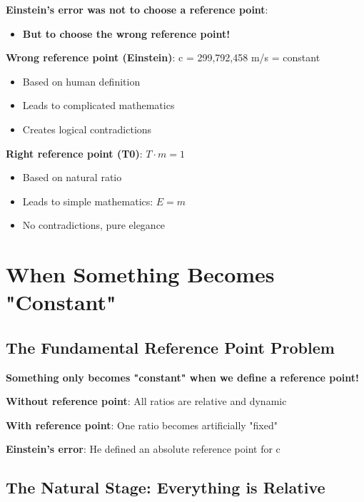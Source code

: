 \documentclass[12pt,a4paper]{article}
\newcommand{\Tfield}{T}
\begin{document}
	\textbf{Einstein's error was not to choose a reference point}:
	\begin{itemize}
		\item \textbf{But to choose the wrong reference point!}
	\end{itemize}
	
	\textbf{Wrong reference point (Einstein)}: c = 299,792,458 m/s = constant
	\begin{itemize}
		\item Based on human definition
		\item Leads to complicated mathematics
		\item Creates logical contradictions
	\end{itemize}
	
	\textbf{Right reference point (T0)}: $\Tfield \cdot m = 1$
	\begin{itemize}
		\item Based on natural ratio
		\item Leads to simple mathematics: $E = m$
		\item No contradictions, pure elegance
	\end{itemize}
	
	\section{When Something Becomes "Constant"}
	
	\subsection{The Fundamental Reference Point Problem}
	
	\begin{tcolorbox}[colback=red!5!white,colframe=red!75!black,title=The Reference Point Illusion]
		\textbf{Something only becomes "constant" when we define a reference point!}
		
		\textbf{Without reference point}: All ratios are relative and dynamic
		
		\textbf{With reference point}: One ratio becomes artificially "fixed"
		
		\textbf{Einstein's error}: He defined an absolute reference point for c
	\end{tcolorbox}
	
	\subsection{The Natural Stage: Everything is Relative}
	
\end{document}
